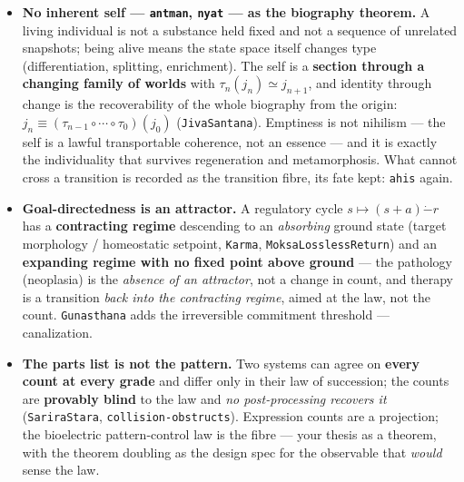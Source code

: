 \documentclass[11pt]{article}
\newcommand{\tm}[1]{\texttt{#1}}
\begin{document}
\begin{itemize}
  \item \textbf{No inherent self --- \tm{antman}, \tm{nyat} --- as the
  biography theorem.} A living individual is not a substance held fixed and not
  a sequence of unrelated snapshots; being alive means the state space itself
  changes type (differentiation, splitting, enrichment). The self is a
  \textbf{section through a changing family of worlds} with
  $\tau_n(j_n) \simeq j_{n+1}$, and identity through change is the recoverability
  of the whole biography from the origin:
  $j_n \equiv (\tau_{n-1} \circ \cdots \circ \tau_0)(j_0)$ (\tm{JivaSantana}).
  Emptiness is not nihilism --- the self is a lawful transportable coherence, not
  an essence --- and it is exactly the individuality that survives regeneration
  and metamorphosis. What cannot cross a transition is recorded as the transition
  fibre, its fate kept: \tm{ahis} again.

  \item \textbf{Goal-directedness is an attractor.} A regulatory cycle
  $s \mapsto (s + a) \dot- r$ has a \textbf{contracting regime} descending to an
  \emph{absorbing} ground state (target morphology / homeostatic setpoint,
  \tm{Karma}, \tm{MoksaLosslessReturn}) and an \textbf{expanding regime with no
  fixed point above ground} --- the pathology (neoplasia) is the \emph{absence
  of an attractor}, not a change in count, and therapy is a transition
  \emph{back into the contracting regime}, aimed at the law, not the count.
  \tm{Gunasthana} adds the irreversible commitment threshold --- canalization.

  \item \textbf{The parts list is not the pattern.} Two systems can agree on
  \textbf{every count at every grade} and differ only in their law of
  succession; the counts are \textbf{provably blind} to the law and \emph{no
  post-processing recovers it} (\tm{SariraStara}, \tm{collision-obstructs}).
  Expression counts are a projection; the bioelectric pattern-control law is the
  fibre --- your thesis as a theorem, with the theorem doubling as the design
  spec for the observable that \emph{would} sense the law.


\end{itemize}
\end{document}
